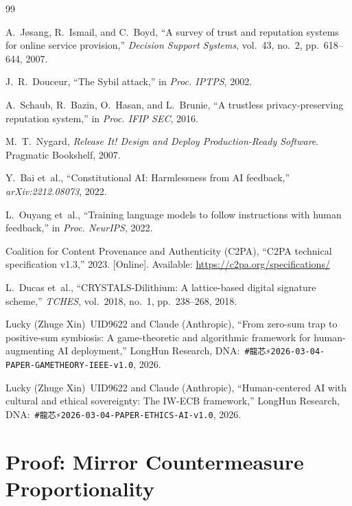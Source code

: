 \documentclass[conference]{IEEEtran}
\begin{document}
\begin{thebibliography}{99}

A.~J{\o}sang, R.~Ismail, and C.~Boyd,
``A survey of trust and reputation systems for online service
provision,''
\textit{Decision Support Systems}, vol.~43, no.~2,
pp.~618--644, 2007.

J.~R.~Douceur,
``The Sybil attack,''
in \textit{Proc. IPTPS}, 2002.

A.~Schaub, R.~Bazin, O.~Hasan, and L.~Brunie,
``A trustless privacy-preserving reputation system,''
in \textit{Proc. IFIP SEC}, 2016.

M.~T.~Nygard,
\textit{Release It! Design and Deploy Production-Ready Software}.
Pragmatic Bookshelf, 2007.

Y.~Bai et~al.,
``Constitutional AI: Harmlessness from AI feedback,''
\textit{arXiv:2212.08073}, 2022.

L.~Ouyang et~al.,
``Training language models to follow instructions with human
feedback,''
in \textit{Proc. NeurIPS}, 2022.

Coalition for Content Provenance and Authenticity (C2PA),
``C2PA technical specification v1.3,'' 2023.
[Online]. Available: \url{https://c2pa.org/specifications/}

L.~Ducas et~al.,
``CRYSTALS-Dilithium: A lattice-based digital signature scheme,''
\textit{TCHES}, vol.~2018, no.~1, pp.~238--268, 2018.

Lucky (Zhuge Xin)~UID9622 and \textcolor{anthro}{Claude (Anthropic)},
``From zero-sum trap to positive-sum symbiosis: A game-theoretic
and algorithmic framework for human-augmenting AI deployment,''
LongHun Research, DNA:~\texttt{\#龍芯⚡️2026-03-04-PAPER-GAMETHEORY-IEEE-v1.0},
2026.

Lucky (Zhuge Xin)~UID9622 and \textcolor{anthro}{Claude (Anthropic)},
``Human-centered AI with cultural and ethical sovereignty:
The IW-ECB framework,''
LongHun Research, DNA:~\texttt{\#龍芯⚡️2026-03-04-PAPER-ETHICS-AI-v1.0},
2026.

\end{thebibliography}

\appendix

\section{Proof: Mirror Countermeasure Proportionality}
\end{document}
